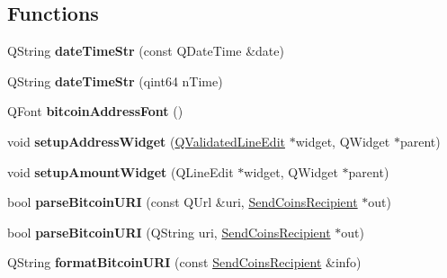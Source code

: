 \subsection*{Functions}
\begin{DoxyCompactItemize}
\item 
\mbox{\label{namespace_g_u_i_util_aae732a04fea25190081120bf0cc773e8}} 
Q\+String {\bfseries date\+Time\+Str} (const Q\+Date\+Time \&date)
\item 
\mbox{\label{namespace_g_u_i_util_ad182b65c8060da6b6c99b8574820084d}} 
Q\+String {\bfseries date\+Time\+Str} (qint64 n\+Time)
\item 
\mbox{\label{namespace_g_u_i_util_a6630c77d0f51ac2a1acdc5fe06c75283}} 
Q\+Font {\bfseries bitcoin\+Address\+Font} ()
\item 
\mbox{\label{namespace_g_u_i_util_aeb3b902c0536bdb9c2def3d3e465aeba}} 
void {\bfseries setup\+Address\+Widget} (\mbox{\hyperlink{class_q_validated_line_edit}{Q\+Validated\+Line\+Edit}} $\ast$widget, Q\+Widget $\ast$parent)
\item 
\mbox{\label{namespace_g_u_i_util_a168a2c8d25a022bbd979c0693ce08297}} 
void {\bfseries setup\+Amount\+Widget} (Q\+Line\+Edit $\ast$widget, Q\+Widget $\ast$parent)
\item 
\mbox{\label{namespace_g_u_i_util_ad39b3e74aaf6adc45b34b36a0649db45}} 
bool {\bfseries parse\+Bitcoin\+U\+RI} (const Q\+Url \&uri, \mbox{\hyperlink{class_send_coins_recipient}{Send\+Coins\+Recipient}} $\ast$out)
\item 
\mbox{\label{namespace_g_u_i_util_a8f3da194579b804909f4ffc73c77fd9e}} 
bool {\bfseries parse\+Bitcoin\+U\+RI} (Q\+String uri, \mbox{\hyperlink{class_send_coins_recipient}{Send\+Coins\+Recipient}} $\ast$out)
\item 
\mbox{\label{namespace_g_u_i_util_ab9d4ba8e8713eebbe4e5eb7cd1ba479e}} 
Q\+String {\bfseries format\+Bitcoin\+U\+RI} (const \mbox{\hyperlink{class_send_coins_recipient}{Send\+Coins\+Recipient}} \&info)
\item 

\end{DoxyCompactItemize}
